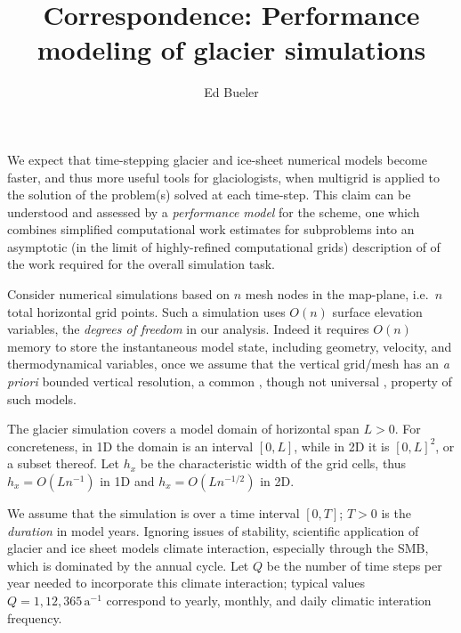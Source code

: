 \documentclass[twocolumn,letterpaper]{igs}
\begin{document}
\title{Correspondence: Performance modeling of glacier simulations}


\author{Ed Bueler}



\maketitle

\sectionsize

We expect that time-stepping glacier and ice-sheet numerical models become faster, and thus more useful tools for glaciologists, when multigrid is applied to the solution of the problem(s) solved at each time-step.  This claim can be understood and assessed by a \emph{performance model} for the scheme, one which combines simplified computational work estimates for subproblems into an asymptotic (in the limit of highly-refined computational grids) description of of the work required for the overall simulation task.

Consider numerical simulations based on $n$ mesh nodes in the map-plane, i.e.~$n$ total horizontal grid points.  Such a simulation uses $O(n)$ surface elevation variables, the \emph{degrees of freedom} in our analysis.  Indeed it requires $O(n)$ memory to store the instantaneous model state, including geometry, velocity, and thermodynamical variables, once we assume that the vertical grid/mesh has an \emph{a priori} bounded vertical resolution, a common \citep[for example]{Brinkerhoffetal2017,Hoffmanetal2018}, though not universal \citep{IsaacStadlerGhattas2015}, property of such models.

The glacier simulation covers a model domain of horizontal span $L>0$.  For concreteness, in 1D the domain is an interval $[0,L]$, while in 2D it is $[0,L]^2$, or a subset thereof.  Let $h_x$ be the characteristic width of the grid cells, thus $h_x = O(L n^{-1})$ in 1D and $h_x = O(L n^{-1/2})$ in 2D.

We assume that the simulation is over a time interval $[0,T]$; $T>0$ is the \emph{duration} in model years.  Ignoring issues of stability, scientific application of glacier and ice sheet models climate interaction, especially through the SMB, which is dominated by the annual cycle.  Let $Q$ be the number of time steps per year needed to incorporate this climate interaction; typical values $Q=1,12,365 \,\text{a}^{-1}$ correspond to yearly, monthly, and daily climatic interation frequency.
\end{document}
